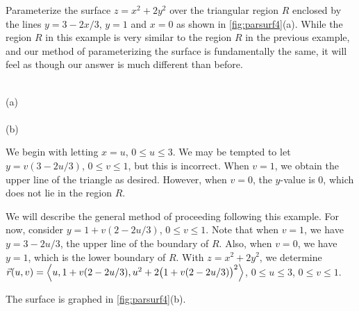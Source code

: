 \begin{example}\label{ex_parsurf4}%
Parameterize the surface $z=x^2+2y^2$ over the triangular region $R$ enclosed by the  lines $y=3-2x/3$, $y=1$ and $x=0$ as shown in \autoref{fig:parsurf4}(a).
\solution
While the region $R$ in this example is very similar to the region $R$ in the previous example, and our method of parameterizing the surface is fundamentally the same, it will feel as though our answer is much different than before.

{
\\[-5pt](a)\\[10pt]
\\(b)}

We begin with letting $x=u$, $0\leq u\leq 3$. We may be tempted to let $y = v(3-2u/3)$, $0\leq v\leq 1$, but this is incorrect. When $v = 1$, we obtain the upper line of the triangle as desired. However, when $v=0$, the $y$-value is 0, which does not lie in the region $R$. 

We will describe the general method of proceeding following this example. For now, consider $y = 1+v(2-2u/3)$, $0\leq v\leq 1$. Note that when $v=1$, we have $y=3-2u/3$, the upper line of the boundary of $R$. Also, when $v=0$, we have $y=1$, which is the lower boundary of $R$. With $z=x^2+2y^2$, we determine $\vec r(u,v) =\left\langle u, 1+v(2-2u/3), u^2+2\bigl(1+v(2-2u/3)\bigr)^2\right\rangle$, $0\leq u\leq 3$, $0\leq v\leq 1$. 

The surface is graphed in \autoref{fig:parsurf4}(b).
\end{example}

